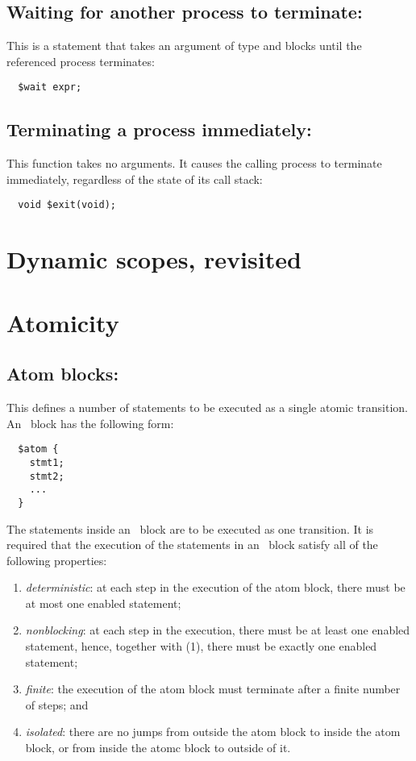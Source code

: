 \subsection{Waiting for another process to terminate: \cwait}

This is a statement that takes an argument of type
\cproc{} and blocks until the referenced process terminates:
\begin{verbatim}
  $wait expr;
\end{verbatim}


\subsection{Terminating a process immediately: \cexit}

This function takes no arguments.  It causes the
calling process to terminate immediately, regardless of the state of
its call stack:
\begin{verbatim}
  void $exit(void);
\end{verbatim}

\section{Dynamic scopes, revisited}

\section{Atomicity}

\subsection{Atom blocks: \catom} This defines a number of statements to be executed
as a single atomic transition.  An \catom~block has the following
form:
\begin{verbatim}
  $atom {
    stmt1;
    stmt2;
    ...
  }
\end{verbatim}

The statements inside an \catom\ block are to be executed as one
transition. It is required that the execution of the statements in an
\catom\ block satisfy all of the following properties:
\begin{enumerate}
\item \emph{deterministic}: at each step in the execution of the atom
  block, there must be at most one enabled statement;
\item \emph{nonblocking}: at each step in the execution, there must be
  at least one enabled statement, hence, together with (1), there must
  be exactly one enabled statement;
\item \emph{finite}: the execution of the atom block must terminate
  after a finite number of steps; and
\item \emph{isolated}: there are no jumps from outside the atom block
  to inside the atom block, or from inside the atomc block to outside
  of it.
\end{enumerate}

